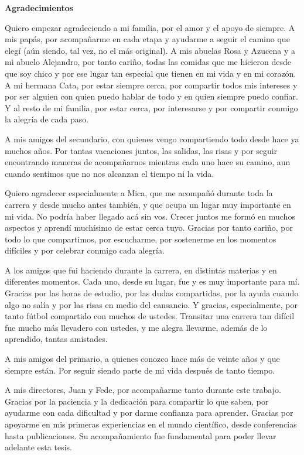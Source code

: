 \documentclass[spanish,a4paper,12pt]{book}
\begin{document}
	\vspace*{0.2cm}
	\begin{center}
		\Large \textbf{Agradecimientos}
	\end{center}
	\vspace{0.2cm}
	
	Quiero empezar agradeciendo a mi familia, por el amor y el apoyo de siempre. A mis papás, por acompañarme en cada etapa y ayudarme a seguir el camino que elegí (aún siendo, tal vez, no el más original). A mis abuelas Rosa y Azucena y a mi abuelo Alejandro, por tanto cariño, todas las comidas que me hicieron desde que soy chico y por ese lugar tan especial que tienen en mi vida y en mi corazón. A mi hermana Cata, por estar siempre cerca, por compartir todos mis intereses y por ser alguien con quien puedo hablar de todo y en quien siempre puedo confiar. Y al resto de mi familia, por estar cerca, por interesarse y por compartir conmigo la alegría de cada paso.
	
	A mis amigos del secundario, con quienes vengo compartiendo	todo desde hace ya muchos años. Por tantas vacaciones juntos, las salidas, las risas y por seguir encontrando maneras	de acompañarnos mientras cada uno hace su camino, aun cuando sentimos que no nos alcanzan el tiempo ni la vida.
		
	Quiero agradecer especialmente a Mica, que me acompañó durante toda la carrera y desde mucho antes también, y que ocupa un lugar muy importante en mi vida. No podría haber llegado acá	sin vos. Crecer juntos me formó en muchos aspectos y aprendí	muchísimo de estar cerca tuyo. Gracias por tanto cariño, por todo lo que compartimos, por escucharme, por sostenerme en los momentos difíciles y por celebrar conmigo cada alegría.
	
	A los amigos que fui haciendo durante la carrera, en distintas materias y en diferentes momentos. Cada uno, desde su lugar,	fue y es muy importante para mí. Gracias por las horas de estudio, por las dudas compartidas, por la ayuda cuando algo no salía y por las risas en medio del cansancio. Y gracias, especialmente, por tanto fútbol compartido con muchos de	ustedes. Transitar una carrera tan difícil fue mucho más llevadero con ustedes, y me alegra llevarme, además de lo	aprendido, tantas amistades.
	
	A mis amigos del primario, a quienes conozco hace más de veinte años y que siempre están. Por seguir siendo parte	de mi vida después de tanto tiempo.
	
	A mis directores, Juan y Fede,	por acompañarme tanto durante este trabajo. Gracias por la paciencia y la dedicación para compartir lo que saben, por ayudarme con cada dificultad y por darme confianza para aprender. Gracias por apoyarme en mis primeras experiencias en el mundo científico, desde conferencias hasta publicaciones. Su acompañamiento fue fundamental para poder llevar adelante esta tesis.
	
\end{document}
